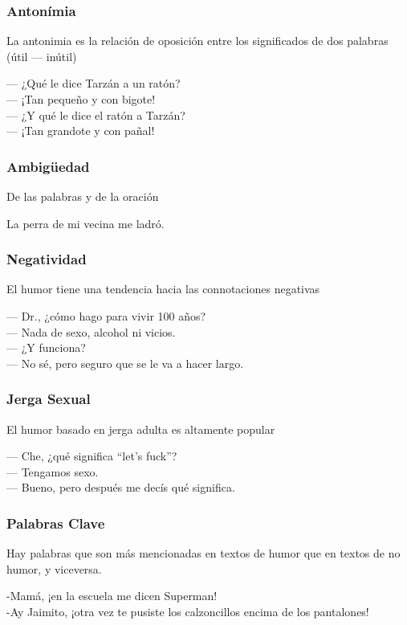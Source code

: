 \begin{frame}
\frametitle{Antonímia}
	La antonimia es la relación de oposición entre los significados de dos palabras (útil — inútil)
	\begin{example}
		— ¿Qué le dice Tarzán a un ratón?\\
		— ¡Tan pequeño y con bigote!\\
		— ¿Y qué le dice el ratón a Tarzán?\\
		— ¡Tan grandote y con pañal!\\
	\end{example}
\end{frame}

\begin{frame}
\frametitle{Ambigüedad}
	De las palabras y de la oración
	\begin{example}
		La perra de mi vecina me ladró.
	\end{example}
\end{frame}

\begin{frame}
\frametitle{Negatividad}
	El humor tiene una tendencia hacia las connotaciones negativas
	\begin{example}
		— Dr., ¿cómo hago para vivir 100 años?\\
		— Nada de sexo, alcohol ni vicios.\\
		— ¿Y funciona?\\
		— No sé, pero seguro que se le va a hacer largo.
	\end{example}
\end{frame}

\begin{frame}
\frametitle{Jerga Sexual}
	El humor basado en jerga adulta es altamente popular
	\begin{example}
		— Che, ¿qué significa “let’s fuck”?\\
		— Tengamos sexo.\\
		— Bueno, pero después me decís qué significa.
	\end{example}
\end{frame}

\begin{frame}
\frametitle{Palabras Clave}
	Hay palabras que son más mencionadas en textos de humor que en textos de no humor, y viceversa.
	\begin{example}
		-Mamá, ¡en la escuela me dicen Superman!\\
		-Ay Jaimito, ¡otra vez te pusiste los calzoncillos encima de los pantalones!
	\end{example}
\end{frame}

